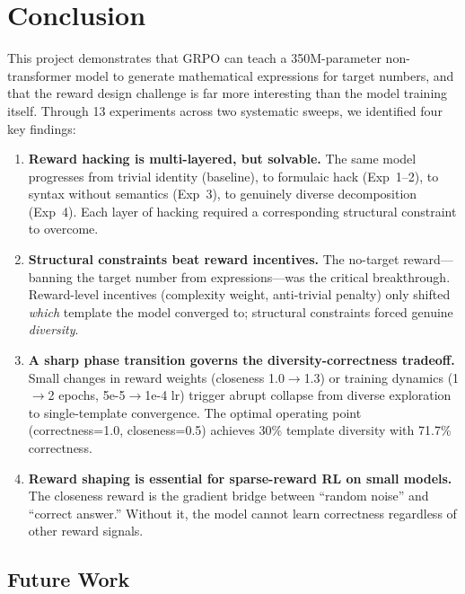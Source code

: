 \documentclass[11pt, letterpaper]{article}
\begin{document}
\section{Conclusion}
\label{sec:conclusion}

This project demonstrates that GRPO can teach a 350M-parameter non-transformer model to generate mathematical expressions for target numbers, and that the reward design challenge is far more interesting than the model training itself. Through 13 experiments across two systematic sweeps, we identified four key findings:

\begin{enumerate}
    \item \textbf{Reward hacking is multi-layered, but solvable.} The same model progresses from trivial identity (baseline), to formulaic hack (Exp~1--2), to syntax without semantics (Exp~3), to genuinely diverse decomposition (Exp~4). Each layer of hacking required a corresponding structural constraint to overcome.
    \item \textbf{Structural constraints beat reward incentives.} The no-target reward---banning the target number from expressions---was the critical breakthrough. Reward-level incentives (complexity weight, anti-trivial penalty) only shifted \emph{which} template the model converged to; structural constraints forced genuine \emph{diversity}.
    \item \textbf{A sharp phase transition governs the diversity-correctness tradeoff.} Small changes in reward weights (closeness 1.0$\to$1.3) or training dynamics (1$\to$2 epochs, 5e-5$\to$1e-4 lr) trigger abrupt collapse from diverse exploration to single-template convergence. The optimal operating point (correctness=1.0, closeness=0.5) achieves 30\% template diversity with 71.7\% correctness.
    \item \textbf{Reward shaping is essential for sparse-reward RL on small models.} The closeness reward is the gradient bridge between ``random noise'' and ``correct answer.'' Without it, the model cannot learn correctness regardless of other reward signals.
\end{enumerate}

\subsection{Future Work}
\end{document}
